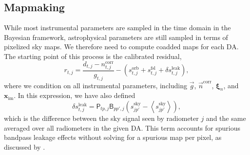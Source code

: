 \documentclass[twocolumn]{aa}
\newcommand{\n}[0]{\vec{n}}
\newcommand{\g}[0]{\vec{g}}
\begin{document}
\subsection{Mapmaking}
\label{sec:mapmaking}

While most instrumental parameters are sampled in the time domain in the
Bayesian framework, astrophysical parameters are still sampled in
terms of pixelized sky maps. We therefore need to compute
coadded maps for each DA. The starting point of this process is the
calibrated residual,
\begin{equation}
r_{t,j}=\frac{d_{t,j}-n_{t,j}^\mathrm{corr}}{g_{t,j}}-(s_{t,j}^\mathrm{orb}+s_{t,j}^\mathrm{fsl}+\delta
s_{t,j}^\mathrm{leak}),
\label{eq:map_res}
\end{equation}
where we condition on all instrumental parameters, including
$\g$, $\n^{\mathrm{corr}}$, $\boldsymbol\xi_n$, and
$\boldsymbol x_{\mathrm{im}}$. In this expression, we have also defined
\begin{equation}
	\delta s_{t,j}^\mathrm{leak}=\mathsf P_{tp,j}\mathsf B_{pp',j}\left(
	s_{jp'}^\mathrm{sky}-\left\langle
        s_{jp'}^\mathrm{sky}\right\rangle\right),
\end{equation}
which is the difference between the sky signal seen by radiometer $j$ and the
same averaged over all radiometers in the given DA. This term accounts for
spurious bandpass leakage effects without solving for a spurious map per pixel,
as discussed by \citet{bp09}.
\end{document}
